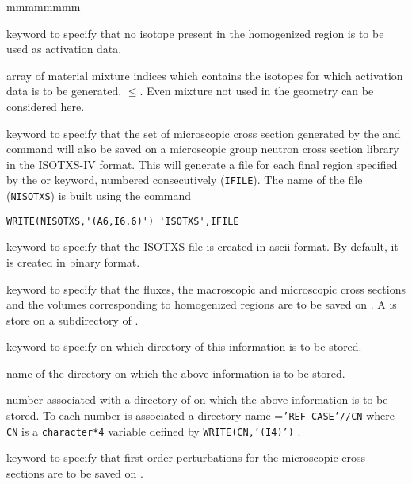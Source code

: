 \begin{ListeDeDescription}{mmmmmmmm}
\item[\moc{NONE}] keyword to specify that no isotope present in the
homogenized region is to be used as activation data.

\item[\dusa{imixa}] array of material mixture indices which contains the
isotopes for which activation data is to be generated.
$\le$. Even mixture not used in the geometry 
can be considered here.

\item[\moc{ISOTXS}] keyword to specify that the set of microscopic cross
section generated by the  and  command will also
be saved on a microscopic group neutron cross section library in the ISOTXS-IV
format. This will generate a file for each final region specified by the
 or  keyword, numbered consecutively ({\tt IFILE}). The name
of the file ({\tt NISOTXS}) is built using the command 

\begin{verbatim}
WRITE(NISOTXS,'(A6,I6.6)') 'ISOTXS',IFILE
\end{verbatim}

\item[\moc{ASCII}] keyword to specify that the ISOTXS file is created in ascii format.
By  default, it is created in binary format.

\item[\moc{SAVE}] keyword to specify that the fluxes, the macroscopic and
microscopic cross sections and the volumes corresponding to homogenized regions
are to be saved on . A  is store on a subdirectory
of .

\item[\moc{ON}] keyword to specify on which directory of  this
information is to be stored.

\item[\dusa{DIRN}] name of the directory on which the above information is to
be stored.

\item[\dusa{idirn}] number associated with a directory of  on
which the above information is to be stored. To each number  is
associated a directory name ={\tt 'REF-CASE'//CN} where {\tt CN} is a
{\tt character*4} variable defined by {\tt WRITE(CN,'(I4)')} .

\item[\moc{PERT}] keyword to specify that first order perturbations for 
the microscopic cross sections are to be saved on . 


\end{ListeDeDescription}
